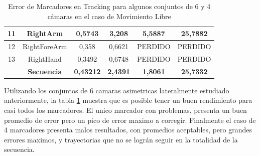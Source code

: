 \begin{table}[h]
\begin{tabular}{c|c|c|c|c|c|}
\multicolumn{1}{|c|}{11} & RightArm & 0,5743 & 3,208 & 5,5887 & 25,7882 \\ \hline
\multicolumn{1}{|c|}{12} & RightForeArm & 0,358 & 0,6621 & PERDIDO & PERDIDO \\ \hline
\multicolumn{1}{|c|}{13} & RightHand & 0,3492 & 0,6748 & PERDIDO & PERDIDO \\ \hline
 & \textbf{Secuencia} & \textbf{0,43212} & \textbf{2,4391} & \textbf{1,8061} & \textbf{25,7332} \\ \cline{2-6} 
\end{tabular}
\label{error_captura_libre_6_4}
\caption{Error de Marcadores en Tracking para algunos conjuntos de 6 y 4 cámaras en el caso de Movimiento Libre}
\end{table}

Utilizando los conjuntos de 6 camaras asimetricas lateralmente estudiado anteriormente, la tabla \ref{error_captura_libre_6_4} muestra que es posible tener un buen rendimiento para casi todos los marcadores. El unico marcador con problemas, presenta un buen promedio de error pero un pico de error maximo a corregir. Finalmente el caso de 4 marcadores presenta malos resultados, con promedios aceptables, pero grandes errores maximos, y trayectorias que no se lográn seguir en la totalidad de la secuencia.




